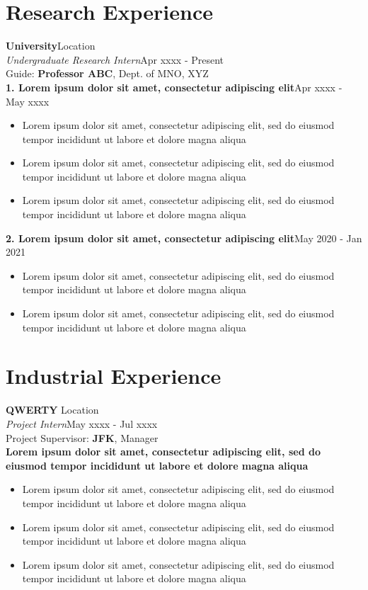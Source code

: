 \documentclass[11pt]{article}
\begin{document}
\section{Research Experience}
	{\bf University}\hfill Location\\
	{\it Undergraduate Research Intern}\hfill Apr xxxx - Present\\
	Guide: {\bf Professor ABC}, Dept. of MNO, XYZ\\
	{\bf 1.  Lorem ipsum dolor sit amet, consectetur adipiscing elit}\hfill Apr xxxx - May xxxx
	\begin{itemize}
	\setlength\itemsep{0.4px}
	\item{Lorem ipsum dolor sit amet, consectetur adipiscing elit, sed do eiusmod tempor incididunt ut labore et dolore magna aliqua}
	\item{Lorem ipsum dolor sit amet, consectetur adipiscing elit, sed do eiusmod tempor incididunt ut labore et dolore magna aliqua}
	\item{Lorem ipsum dolor sit amet, consectetur adipiscing elit, sed do eiusmod tempor incididunt ut labore et dolore magna aliqua}
	\end{itemize}
	{\bf 2. Lorem ipsum dolor sit amet, consectetur adipiscing elit}\hfill May 2020 - Jan 2021
	\begin{itemize}
	\setlength\itemsep{0.4px}
	\item{Lorem ipsum dolor sit amet, consectetur adipiscing elit, sed do eiusmod tempor incididunt ut labore et dolore magna aliqua}
	\item{Lorem ipsum dolor sit amet, consectetur adipiscing elit, sed do eiusmod tempor incididunt ut labore et dolore magna aliqua}
	\end{itemize}
\section{Industrial Experience}
	{\bf QWERTY} \hfill Location\\
	{\it Project Intern}\hfill  May xxxx - Jul xxxx\\
	Project Supervisor: {\bf JFK}, Manager\\
	{\bf Lorem ipsum dolor sit amet, consectetur adipiscing elit, sed do eiusmod tempor incididunt ut labore et dolore magna aliqua}
	\begin{itemize}
	\setlength\itemsep{0.4px}
	\item{Lorem ipsum dolor sit amet, consectetur adipiscing elit, sed do eiusmod tempor incididunt ut labore et dolore magna aliqua}
	\item{Lorem ipsum dolor sit amet, consectetur adipiscing elit, sed do eiusmod tempor incididunt ut labore et dolore magna aliqua}
	\item{Lorem ipsum dolor sit amet, consectetur adipiscing elit, sed do eiusmod tempor incididunt ut labore et dolore magna aliqua}
	\end{itemize}
\end{document}
